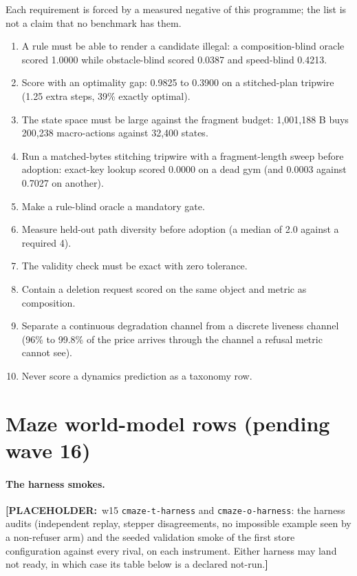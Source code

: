 \documentclass{article} %
\newcommand{\PLACEHOLDER}[1]{{\color{red}\textbf{[PLACEHOLDER:}~#1\textbf{]}}}
\begin{document}
Each requirement is forced by a measured negative of this programme; the list is not a claim that
no benchmark has them. %
\begin{enumerate}[leftmargin=*,itemsep=1pt]
\item A rule must be able to render a candidate illegal: a composition-blind oracle scored 1.0000
  while obstacle-blind scored 0.0387 and speed-blind 0.4213. %
\item Score with an optimality gap: 0.9825 to 0.3900 on a stitched-plan tripwire (1.25 extra steps,
  39\% exactly optimal). %
\item The state space must be large against the fragment budget: 1,001,188 B buys 200,238
  macro-actions against 32,400 states. %
\item Run a matched-bytes stitching tripwire with a fragment-length sweep before adoption: exact-key
  lookup scored 0.0000 on a dead gym (and 0.0003 against 0.7027 on another).
\item Make a rule-blind oracle a mandatory gate.
\item Measure held-out path diversity before adoption (a median of 2.0 against a required 4).
\item The validity check must be exact with zero tolerance.
\item Contain a deletion request scored on the same object and metric as composition.
\item Separate a continuous degradation channel from a discrete liveness channel (96\% to 99.8\% of
  the price arrives through the channel a refusal metric cannot see). %
\item Never score a dynamics prediction as a taxonomy row.
\end{enumerate}

\section{Maze world-model rows (pending wave 16)} %
\label{app:mazewm}

\paragraph{The harness smokes.} \PLACEHOLDER{w15 \texttt{cmaze-t-harness} and
\texttt{cmaze-o-harness}: the harness audits (independent replay, stepper disagreements, no
impossible example seen by a non-refuser arm) and the seeded validation smoke of the first
store configuration against every rival, on each instrument. Either harness may land not
ready, in which case its table below is a declared not-run.}
\end{document}
